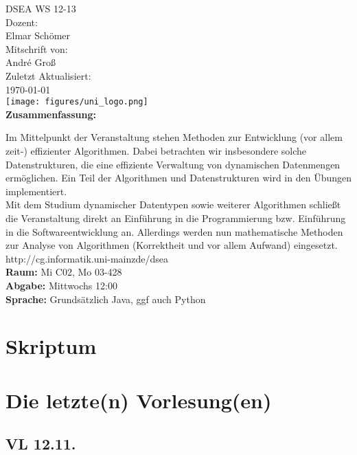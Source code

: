 \documentclass[a4paper,draft,twoside,10pt]{report}
\begin{document}
\begin{titlepage}
\center
\Large DSEA WS 12-13\large \\[2em]
Dozent:\\Elmar Schömer\\[2em]
Mitschrift von:\\André Groß\\[2em]
Zuletzt Aktualisiert:\\\today\\
\texttt{[image: figures/uni\_logo.png]}\\[3em]
\Large \textbf{Zusammenfassung:}\\[1em]
\parbox{0.75\textwidth}{\large
Im Mittelpunkt der Veranstaltung stehen Methoden zur Entwicklung (vor allem \mbox{zeit-)} effizienter Algorithmen. Dabei betrachten wir insbesondere solche Datenstrukturen, die eine effiziente Verwaltung von dynamischen Datenmengen ermöglichen. Ein Teil der Algorithmen und Datenstrukturen wird in den Übungen implementiert.\\[.5em]

Mit dem Studium dynamischer Datentypen sowie weiterer Algorithmen schließt die Veranstaltung direkt an Einführung in die Programmierung bzw. Einführung in die Softwareentwicklung an. Allerdings werden nun mathematische Methoden zur Analyse von Algorithmen (Korrektheit und vor allem Aufwand) eingesetzt.\\[.5em]

http://cg.informatik.uni-mainzde/dsea\\
\textbf{Raum:} Mi C02, Mo 03-428\\
\textbf{Abgabe:} Mittwochs 12:00\\
\textbf{Sprache:} Grundsätzlich Java, ggf auch Python
}
\end{titlepage}
\normalsize
\tableofcontents
\twocolumn

\part{Skriptum}

\part{Die letzte(n) Vorlesung(en)}
\chapter{VL 12.11.}
\end{document}
